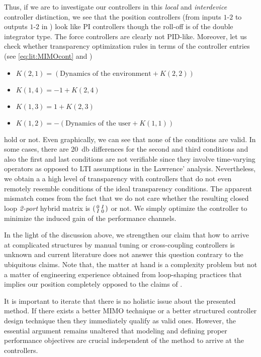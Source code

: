 Thus, if we are to investigate our controllers in this \emph{local} and \emph{interdevice} controller distinction, we see that the position 
controllers (from inputs $1$-$2$ to outputs $1$-$2$ in ) look like PI controllers though the roll-off is of the double
integrator type. The force controllers are clearly not PID-like. Moreover, let us check whether transparency optimization rules in terms of the 
controller entries (see \eqref{eq:lit:MIMOcont} and )
\begin{itemize}
    \item  $K(2,1)= (\text{Dynamics of the environment}+K(2,2))$
	\item  $K(1,4)= -1+K(2,4)$
    \item  $K(1,3)= 1+K(2,3)$
    \item  $K(1,2)= -(\text{Dynamics of the user}+K(1,1))$
\end{itemize}
hold or not. Even graphically, we can see that none of the conditions are valid. In some cases, there are \SI{20}{\decibel} differences for the second
and third conditions and also the first and last conditions are not verifiable since they involve time-varying operators as opposed to LTI assumptions in the 
Lawrence' analysis. Nevertheless, we obtain a a high level of transparency with controllers that do not even remotely resemble conditions of the 
ideal transparency conditions. The apparent mismatch comes from the fact that we do not care whether the resulting closed loop \emph{2-port} hybrid
matrix is $\begin{psmallmatrix}0&I\\I&0\end{psmallmatrix}$ or not. We simply optimize the controller to minimize the induced gain of the performance 
channels.


In the light of the discussion above, we strengthen our claim that how to arrive at complicated structures by manual tuning or cross-coupling 
controllers is unknown and current literature does not answer this question contrary to the ubiquitous claims. Note that, the matter at hand 
is a complexity problem but not a matter of engineering experience obtained from loop-shaping practices that implies our position completely 
opposed to the claims of \cite{danielmcaree}. 

It is important to iterate that there is no holistic issue about the presented method. If there exists a better MIMO technique or a better 
structured controller design technique then they immediately qualify as valid ones. However, the essential argument remains unaltered that 
modeling and defining proper performance objectives are crucial independent of the method to arrive at the controllers.



